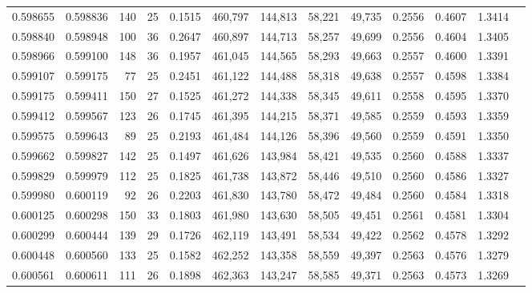 \begin{tabular}{rrrrrrrrrrrrr}
0.598655 & 0.598836 &   140 &  25 &                                     0.1515 & 460,797 & 144,813 &  58,221 &  49,735 & 0.2556 & 0.4607 & 1.3414 \\
0.598840 & 0.598948 &   100 &  36 &                                     0.2647 & 460,897 & 144,713 &  58,257 &  49,699 & 0.2556 & 0.4604 & 1.3405 \\
0.598966 & 0.599100 &   148 &  36 &                                     0.1957 & 461,045 & 144,565 &  58,293 &  49,663 & 0.2557 & 0.4600 & 1.3391 \\
0.599107 & 0.599175 &    77 &  25 &                                     0.2451 & 461,122 & 144,488 &  58,318 &  49,638 & 0.2557 & 0.4598 & 1.3384 \\
0.599175 & 0.599411 &   150 &  27 &                                     0.1525 & 461,272 & 144,338 &  58,345 &  49,611 & 0.2558 & 0.4595 & 1.3370 \\
0.599412 & 0.599567 &   123 &  26 &                                     0.1745 & 461,395 & 144,215 &  58,371 &  49,585 & 0.2559 & 0.4593 & 1.3359 \\
0.599575 & 0.599643 &    89 &  25 &                                     0.2193 & 461,484 & 144,126 &  58,396 &  49,560 & 0.2559 & 0.4591 & 1.3350 \\
0.599662 & 0.599827 &   142 &  25 &                                     0.1497 & 461,626 & 143,984 &  58,421 &  49,535 & 0.2560 & 0.4588 & 1.3337 \\
0.599829 & 0.599979 &   112 &  25 &                                     0.1825 & 461,738 & 143,872 &  58,446 &  49,510 & 0.2560 & 0.4586 & 1.3327 \\
0.599980 & 0.600119 &    92 &  26 &                                     0.2203 & 461,830 & 143,780 &  58,472 &  49,484 & 0.2560 & 0.4584 & 1.3318 \\
0.600125 & 0.600298 &   150 &  33 &                                     0.1803 & 461,980 & 143,630 &  58,505 &  49,451 & 0.2561 & 0.4581 & 1.3304 \\
0.600299 & 0.600444 &   139 &  29 &                                     0.1726 & 462,119 & 143,491 &  58,534 &  49,422 & 0.2562 & 0.4578 & 1.3292 \\
0.600448 & 0.600560 &   133 &  25 &                                     0.1582 & 462,252 & 143,358 &  58,559 &  49,397 & 0.2563 & 0.4576 & 1.3279 \\
0.600561 & 0.600611 &   111 &  26 &                                     0.1898 & 462,363 & 143,247 &  58,585 &  49,371 & 0.2563 & 0.4573 & 1.3269 \\

\end{tabular}
